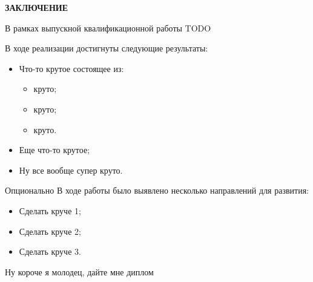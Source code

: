 \newpage
{\centering
\normal
\textbf{ЗАКЛЮЧЕНИЕ}\par
}

В рамках выпускной квалификационной работы TODO

В ходе реализации достигнуты следующие результаты:
\begin{itemize}
  \item Что-то крутое состоящее из:
  \begin{itemize}
    \item круто;
    \item круто;
    \item круто.
  \end{itemize}
  \item Еще что-то крутое;
  \item Ну все вообще супер круто.
\end{itemize}

\(Опционально\) В ходе работы было выявлено несколько направлений для развития:
\begin{itemize}
  \item Сделать круче 1;
  \item Сделать круче 2;
  \item Сделать круче 3.
\end{itemize}

Ну короче я молодец, дайте мне диплом
